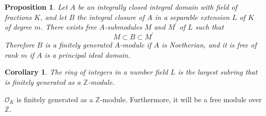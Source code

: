 \documentclass[11pt,a4paper,reqno]{amsart}
\numberwithin{equation}{section}
\newtheorem{prop}[thm]{Proposition}
\newtheorem{cor}[thm]{Corollary}
\begin{document}

\begin{prop} \label{prop 2.29} 
Let $A$ be an integrally closed integral domain with field of fractions $K$, 
and let $B$ the integral closure of $A$ in a separable extension $L$ of $K$ of degree $m$. 
There exists free $A$-submodules $M$ and $M^\prime$ of $L$ 
such that 
\begin{equation} \label{6} 
M \subset B \subset M^\prime 
\end{equation} 
Therefore $B$ is a finitely generated $A$-module if $A$ is Noetherian, 
and it is free of rank $m$ if $A$ is a principal ideal domain. 
\end{prop} 

\begin{cor} \label{cor 2.30} 
The ring of integers in a number field $L$ is the largest subring that is finitely generated as a $\mathbb{Z}$-module. 
\end{cor} 

 $\mathcal{O}_K$ is finitely generated as a $\mathbb{Z}$-module. Furthermore, it will be a free module over $\mathbb{Z}$.





\end{document}
